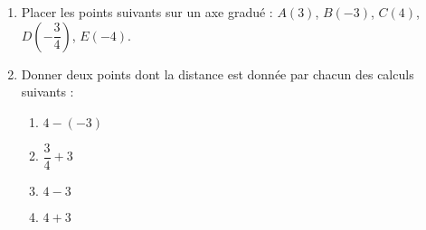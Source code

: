 
\begin{exercice}\label{exo2smath-0238}

    \begin{enumerate}
        \item
            Placer les points suivants sur un axe gradué : \( A(3)\), \( B(-3)\), \( C(4)\), \( D(-\dfrac{ 3 }{ 4 })\), \( E(-4)\).
        \item
            Donner deux points dont la distance est donnée par chacun des calculs suivants :
            \begin{multicols}{2}
            \begin{enumerate}
                \item
                    \( 4-(-3)\)
                \item
                    \( \dfrac{ 3 }{ 4 }+3\)
                \item
                    \( 4-3\)
                \item
                    \( 4+3\)
            \end{enumerate}
            \end{multicols}
    \end{enumerate}

\end{exercice}
